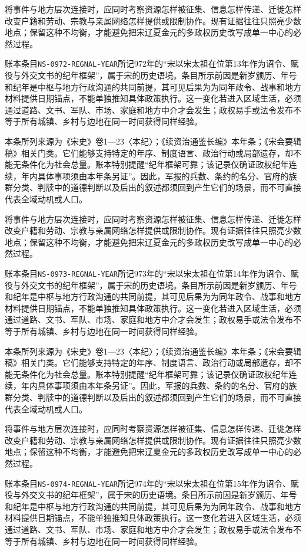 将事件与地方层次连接时，应同时考察资源怎样被征集、信息怎样传递、迁徙怎样改变户籍和劳动、宗教与亲属网络怎样提供或限制协作。现有证据往往只照亮少数地点；保留这种不均衡，才能避免把宋辽夏金元的多政权历史改写成单一中心的必然过程。

账本条目\texttt{NS-0972-REGNAL-YEAR}所记972年的“宋以宋太祖在位第13年作为诏令、赋役与外交文书的纪年框架”，属于宋的历史语境。条目所示前因是新岁颁历、年号和纪年是中枢与地方行政沟通的共同前提，其可见后果为为同年政令、战事和地方材料提供日期锚点，不能单独推知具体政策执行。这一变化若进入区域生活，必须通过道路、文书、军队、市场、家庭和地方中介才会发生；政权易手或法令发布不等于所有城镇、乡村与边地在同一时间获得同样经验。

本条所列来源为《宋史》卷1—23〈本纪〉；《续资治通鉴长编》本年条；《宋会要辑稿》相关门类。它们能够支持特定的年序、制度语言、政治行动或局部遗存，却不能无条件化为社会总量。账本特别提醒“纪年框架可靠；该记录仅确证政权纪年连续，年内具体事项须由本年条另证”。因此，军报的兵数、条约的名分、官府的族群分类、判牍中的道德判断以及后出的叙述都须回到产生它们的场景，而不可直接代表全域动机或人口。

将事件与地方层次连接时，应同时考察资源怎样被征集、信息怎样传递、迁徙怎样改变户籍和劳动、宗教与亲属网络怎样提供或限制协作。现有证据往往只照亮少数地点；保留这种不均衡，才能避免把宋辽夏金元的多政权历史改写成单一中心的必然过程。

账本条目\texttt{NS-0973-REGNAL-YEAR}所记973年的“宋以宋太祖在位第14年作为诏令、赋役与外交文书的纪年框架”，属于宋的历史语境。条目所示前因是新岁颁历、年号和纪年是中枢与地方行政沟通的共同前提，其可见后果为为同年政令、战事和地方材料提供日期锚点，不能单独推知具体政策执行。这一变化若进入区域生活，必须通过道路、文书、军队、市场、家庭和地方中介才会发生；政权易手或法令发布不等于所有城镇、乡村与边地在同一时间获得同样经验。

本条所列来源为《宋史》卷1—23〈本纪〉；《续资治通鉴长编》本年条；《宋会要辑稿》相关门类。它们能够支持特定的年序、制度语言、政治行动或局部遗存，却不能无条件化为社会总量。账本特别提醒“纪年框架可靠；该记录仅确证政权纪年连续，年内具体事项须由本年条另证”。因此，军报的兵数、条约的名分、官府的族群分类、判牍中的道德判断以及后出的叙述都须回到产生它们的场景，而不可直接代表全域动机或人口。

将事件与地方层次连接时，应同时考察资源怎样被征集、信息怎样传递、迁徙怎样改变户籍和劳动、宗教与亲属网络怎样提供或限制协作。现有证据往往只照亮少数地点；保留这种不均衡，才能避免把宋辽夏金元的多政权历史改写成单一中心的必然过程。

账本条目\texttt{NS-0974-REGNAL-YEAR}所记974年的“宋以宋太祖在位第15年作为诏令、赋役与外交文书的纪年框架”，属于宋的历史语境。条目所示前因是新岁颁历、年号和纪年是中枢与地方行政沟通的共同前提，其可见后果为为同年政令、战事和地方材料提供日期锚点，不能单独推知具体政策执行。这一变化若进入区域生活，必须通过道路、文书、军队、市场、家庭和地方中介才会发生；政权易手或法令发布不等于所有城镇、乡村与边地在同一时间获得同样经验。


